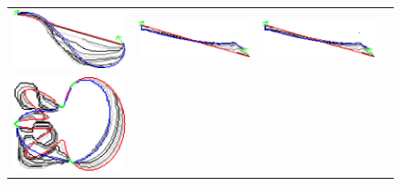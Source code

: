 \begin{figure}
\begin{tabular}{cccc}
\includegraphics[scale=0.2]{figures/chapter9/constrained-elastica/localsearch/curve-3/len_pen-0.0002/radius-15/nc-4/h1.0/summary.pdf} &
\includegraphics[scale=0.25]{figures/chapter9/constrained-elastica/graphflow/curve-3/len_pen-0.002/radius-15/N-1/h1.0/summary.pdf} &
\includegraphics[scale=0.25]{figures/chapter9/constrained-elastica/graphflow/curve-3/len_pen-0.0002/radius-15/N-1/h1.0/summary.pdf}\\
\includegraphics[scale=0.2]{figures/chapter9/constrained-elastica/localsearch/flower-1/len_pen-0.002/radius-15/nc-4/h1.0/summary.pdf} &

\end{tabular}
\end{figure}
